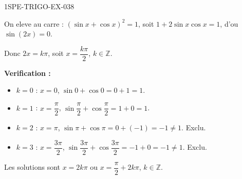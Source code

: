 \begin{corrige}{1SPE-TRIGO-EX-038}

On eleve au carre : $(\sin x + \cos x)^2 = 1$, soit $1 + 2\sin x\cos x = 1$, d'ou $\sin(2x) = 0$.

Donc $2x = k\pi$, soit $x = \dfrac{k\pi}{2}$, $k \in \mathbb{Z}$.

\textbf{Verification :}
\begin{itemize}
  \item $k = 0$ : $x = 0$, $\sin 0 + \cos 0 = 0 + 1 = 1$. \checkmark
  \item $k = 1$ : $x = \dfrac{\pi}{2}$, $\sin\dfrac{\pi}{2} + \cos\dfrac{\pi}{2} = 1 + 0 = 1$. \checkmark
  \item $k = 2$ : $x = \pi$, $\sin\pi + \cos\pi = 0 + (-1) = -1 \neq 1$. Exclu.
  \item $k = 3$ : $x = \dfrac{3\pi}{2}$, $\sin\dfrac{3\pi}{2} + \cos\dfrac{3\pi}{2} = -1 + 0 = -1 \neq 1$. Exclu.
\end{itemize}

Les solutions sont $x = 2k\pi$ ou $x = \dfrac{\pi}{2} + 2k\pi$, $k \in \mathbb{Z}$.

\end{corrige}
